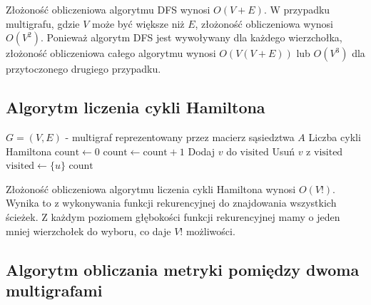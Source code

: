 Złożoność obliczeniowa algorytmu DFS wynosi \( O(V + E) \). W przypadku multigrafu, gdzie \( V \) może być większe niż \( E \), złożoność obliczeniowa wynosi \( O(V^2) \). Ponieważ algorytm DFS jest wywoływany dla każdego wierzchołka, złożoność obliczeniowa całego algorytmu wynosi \( O(V(V + E)) \) lub \( O(V^3) \) dla przytoczonego drugiego przypadku.

\subsection{Algorytm liczenia cykli Hamiltona}
\begin{algorithm}[H]
\caption{Liczenie cykli Hamiltona w multigrafie}\label{alg:count_hamiltonian_cycles}
\begin{algorithmic}[1]
\Require \( G = (V, E) \) - multigraf reprezentowany przez macierz sąsiedztwa \( A \)
\Ensure Liczba cykli Hamiltona
\State \( \text{count} \gets 0 \)
        \State \( \text{count} \gets \text{count} + 1 \)
        \State \Return
    \EndIf
            \State Dodaj \( v \) do \( \text{visited} \)
            \State {}
            \State Usuń \( v \) z \( \text{visited} \)
        \EndIf
    \EndFor
\EndFunction
{}
    \State \( \text{visited} \gets \{u\} \)
    \State {}
\EndFor
\State \Return \( \text{count} \)
\end{algorithmic}
\end{algorithm}

Złożoność obliczeniowa algorytmu liczenia cykli Hamiltona wynosi \( O(V!) \). Wynika to z wykonywania funkcji rekurencyjnej do znajdowania wszystkich ścieżek. Z każdym poziomem głębokości funkcji rekurencyjnej mamy o jeden mniej wierzchołek do wyboru, co daje \( V! \) możliwości.

\subsection{Algorytm obliczania metryki pomiędzy dwoma multigrafami}

